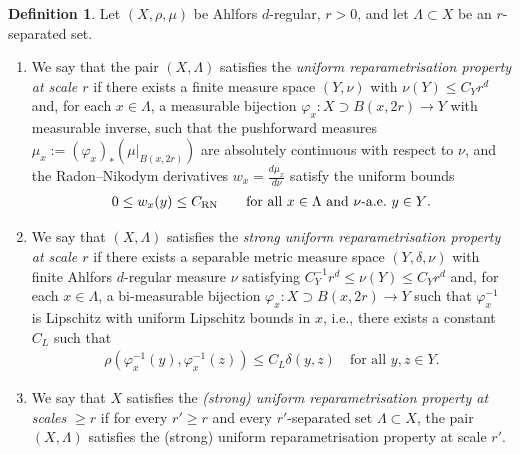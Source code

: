 \documentclass[12pt,reqno]{amsart}
\theoremstyle{definition}
\newtheorem{definition}[theorem]{Definition}
\theoremstyle{remark}
\numberwithin{equation}{section}
\newcommand{\1}{\mathbbm{1}}
\renewcommand{\phi}{\varphi}
\begin{document}
\begin{definition}\label{asspt: uniform Radon-Nikodym}
Let $(X,\rho,\mu)$ be Ahlfors $d$-regular, $r>0$, and
let $\Lambda\subset X$ be an $r$-separated set. 
\begin{enumerate}
    \item We say that the pair $(X,\Lambda)$ satisfies the \emph{uniform reparametrisation property at scale $r$}
if there exists a finite measure space $(Y,\nu)$ with $\nu(Y)\leq C_Yr^d$ and, for each $x\in\Lambda$, a measurable bijection 
$\phi_x : X\supset B(x,2r) \to Y$ with measurable inverse,
such that the pushforward measures $\mu_x:=(\phi_x)_*(\mu|_{B(x,2r)})$ 
are absolutely continuous with respect to $\nu$, and the Radon–Nikodym derivatives
$w_x = \frac{d\mu_x}{d\nu}$ satisfy the uniform bounds
\begin{align}\label{eq: uniform bounds on Radon–Nikodym derivatives}
0\leq w_x(y) \leq C_{\rm RN}\qquad \text{for all $x\in\Lambda$ and $\nu$-a.e.\ $y\in Y$}.
\end{align}
\item We say that $(X,\Lambda)$ satisfies the \emph{strong uniform reparametrisation property at scale $r$} if there exists a separable metric measure space $(Y,\delta,\nu)$ with finite Ahlfors $d$-regular measure $\nu$ satisfying $C_Y^{-1}r^d \leq \nu(Y) \leq C_Yr^d$ and, for each $x\in\Lambda$, a bi-measurable bijection $\phi_x : X\supset B(x,2r) \to Y$ such that
$\phi_x^{-1}$ is Lipschitz with uniform Lipschitz bounds in $x$, i.e., there exists a constant $C_{L}$ such that 
\begin{align*}
   \rho(\phi_x^{-1}(y),\phi_x^{-1}(z))\leq C_{L} \delta(y,z) \quad\mbox{for all }y,z\in Y.
\end{align*} 
\item We say that $X$ satisfies the \emph{(strong) uniform reparametrisation property at scales $\geq r$} if for every $r'\geq r$ and every $r'$-separated set $\Lambda\subset X$, the pair $(X,\Lambda)$ satisfies the (strong) uniform reparametrisation property at scale $r'$.
\end{enumerate}
\end{definition}
\end{document}
